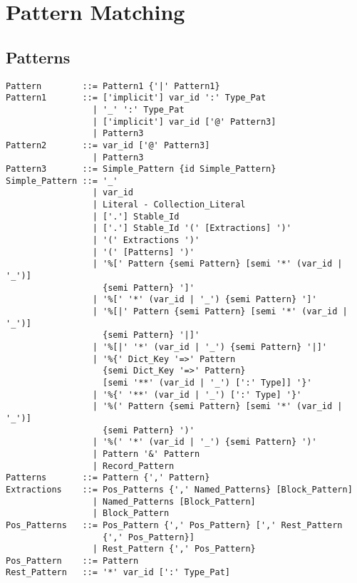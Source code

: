 
\chapter{Pattern Matching}
\label{sec:pattern-matching}

\minitoc

\newpage




\section{Patterns}
\label{sec:patterns}

\syntax\begin{lstlisting}
Pattern        ::= Pattern1 {'|' Pattern1}
Pattern1       ::= ['implicit'] var_id ':' Type_Pat
                 | '_' ':' Type_Pat
                 | ['implicit'] var_id ['@' Pattern3]
                 | Pattern3
Pattern2       ::= var_id ['@' Pattern3]
                 | Pattern3
Pattern3       ::= Simple_Pattern {id Simple_Pattern}
Simple_Pattern ::= '_'
                 | var_id
                 | Literal - Collection_Literal
                 | ['.'] Stable_Id
                 | ['.'] Stable_Id '(' [Extractions] ')' 
                 | '(' Extractions ')'
                 | '(' [Patterns] ')'
                 | '%[' Pattern {semi Pattern} [semi '*' (var_id | '_')] 
                   {semi Pattern} ']'
                 | '%[' '*' (var_id | '_') {semi Pattern} ']'
                 | '%[|' Pattern {semi Pattern} [semi '*' (var_id | '_')] 
                   {semi Pattern} '|]'
                 | '%[|' '*' (var_id | '_') {semi Pattern} '|]'
                 | '%{' Dict_Key '=>' Pattern 
                   {semi Dict_Key '=>' Pattern}
                   [semi '**' (var_id | '_') [':' Type]] '}'
                 | '%{' '**' (var_id | '_') [':' Type] '}'
                 | '%(' Pattern {semi Pattern} [semi '*' (var_id | '_')] 
                   {semi Pattern} ')'
                 | '%(' '*' (var_id | '_') {semi Pattern} ')'
                 | Pattern '&' Pattern
                 | Record_Pattern
Patterns       ::= Pattern {',' Pattern}
Extractions    ::= Pos_Patterns {',' Named_Patterns} [Block_Pattern]
                 | Named_Patterns [Block_Pattern]
                 | Block_Pattern
Pos_Patterns   ::= Pos_Pattern {',' Pos_Pattern} [',' Rest_Pattern 
                   {',' Pos_Pattern}]
                 | Rest_Pattern {',' Pos_Pattern}
Pos_Pattern    ::= Pattern
Rest_Pattern   ::= '*' var_id [':' Type_Pat]

\end{lstlisting}

